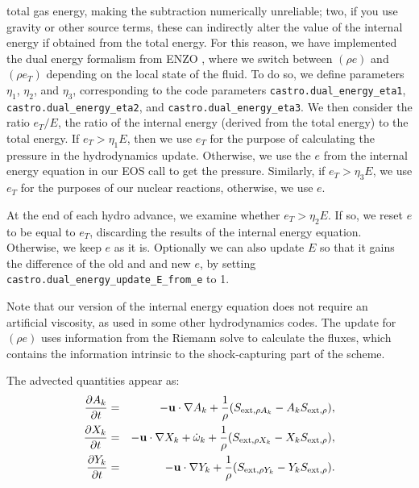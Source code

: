 total gas energy, making the subtraction numerically unreliable; two, if you use gravity or
other source terms, these can indirectly alter the value of the internal energy if obtained
from the total energy. For this reason, we have implemented the dual energy formalism from ENZO
\cite{bryan:1995,bryan:2014}, where we switch between $(\rho e)$ and $(\rho e_T)$
depending on the local state of the fluid. To do so, we define parameters $\eta_1$, $\eta_2$, and
$\eta_3$, corresponding to the code parameters {\tt castro.dual\_energy\_eta1},
{\tt castro.dual\_energy\_eta2}, and {\tt castro.dual\_energy\_eta3}. We then consider the ratio
$e_T / E$, the ratio of the internal energy (derived from the total energy)
to the total energy. If $e_T > \eta_1 E$, then we use $e_T$ for the purpose of calculating the pressure
in the hydrodynamics update. Otherwise, we use the $e$ from the internal energy equation in our EOS call to get
the pressure. Similarly, if $e_T > \eta_3 E$, we use $e_T$ for the purposes of our nuclear reactions,
otherwise, we use $e$.

At the end of each hydro advance, we examine whether $e_T > \eta_2 E$. If so, we reset
$e$ to be equal to $e_T$, discarding the results of the internal energy equation. Otherwise,
we keep $e$ as it is. Optionally we can also update $E$ so that it gains the difference of the
old and and new $e$, by setting {\tt castro.dual\_energy\_update\_E\_from\_e} to 1.

Note that our version of the internal energy equation does not require an artificial viscosity,
as used in some other hydrodynamics codes. The update for $(\rho e)$ uses information from
the Riemann solve to calculate the fluxes, which contains the information intrinsic to the
shock-capturing part of the scheme.

The advected quantities appear as:
\begin{eqnarray}
\frac{\partial A_k}{\partial t} &=& -{\bf u}\cdot\nabla A_k + \frac{1}{\rho}
                                     ( S_{{\rm ext},\rho A_k} - A_k S_{{\rm ext},\rho} ), \\
\frac{\partial X_k}{\partial t} &=& -{\bf u}\cdot\nabla X_k + \dot\omega_k + \frac{1}{\rho}
                                     ( S_{{\rm ext},\rho X_k}  - X_k S_{{\rm ext},\rho} ), \\
\frac{\partial Y_k}{\partial t} &=& -{\bf u}\cdot\nabla Y_k + \frac{1}{\rho} 
                                     ( S_{{\rm ext},\rho Y_k}  - Y_k S_{{\rm ext},\rho} ).
\end{eqnarray}

